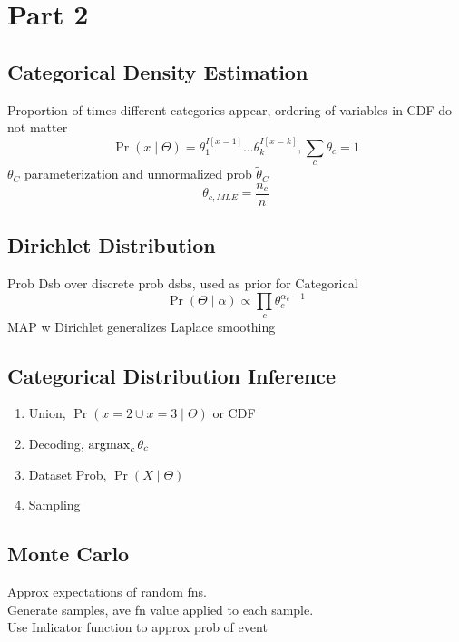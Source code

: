 \section{Part 2}
\subsection*{Categorical Density Estimation}
Proportion of times different categories appear, 
ordering of variables in CDF do not matter\\
\[\Pr(x\mid\Theta)=\theta_1^{I{[x=1]}}\dots\theta_k^{I{[x=k]}},\sum_c \theta_c=1\]
$\theta_C$ parameterization and unnormalized prob $\tilde{\theta}_C$\\
\[\theta_{c,MLE}=\frac{n_c}{n}\]
\subsection*{Dirichlet Distribution}
Prob Dsb over discrete prob dsbs, used as prior for Categorical
\[\Pr(\Theta\mid\alpha)\propto \prod_c \theta_c^{\alpha_c-1}\]
MAP w Dirichlet generalizes Laplace smoothing
\subsection*{Categorical Distribution Inference}
\begin{enumerate}
    \item Union, $\Pr(x=2\cup x=3\mid\Theta)$ or CDF
    \item Decoding, $\operatorname*{\arg\!\max}_c \theta_c$
    \item Dataset Prob, $\Pr(X\mid\Theta)$
    \item Sampling
\end{enumerate}
\subsection*{Monte Carlo}
Approx expectations of random fns.\\
Generate samples, ave fn value applied to each sample.\\
Use Indicator function to approx prob of event
